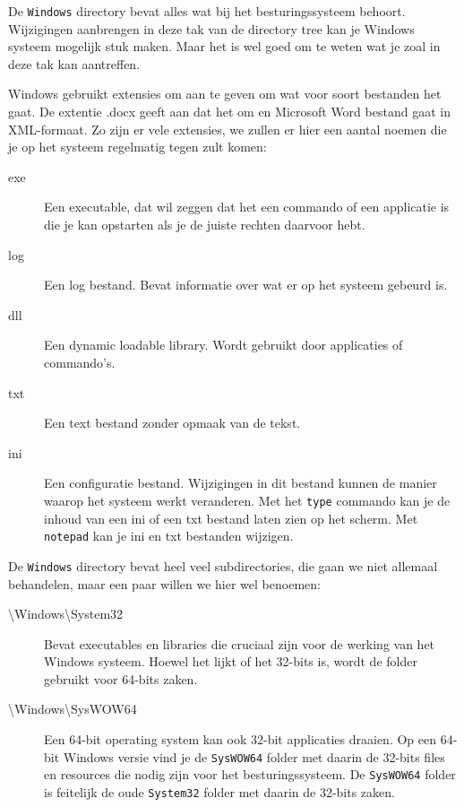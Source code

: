 De \texttt{Windows} directory bevat alles wat bij het besturingssysteem behoort. Wijzigingen aanbrengen in deze tak van de directory tree kan je Windows systeem mogelijk stuk maken. Maar het is wel goed om te weten wat je zoal in deze tak kan aantreffen.

Windows gebruikt extensies om aan te geven om wat voor soort bestanden het gaat. De extentie .docx geeft aan dat het om en Microsoft Word bestand gaat in XML-formaat. Zo zijn er vele extensies, we zullen er hier een aantal noemen die je op het systeem regelmatig tegen zult komen:
\begin{description}
\item[exe] Een executable, dat wil zeggen dat het een commando of een applicatie is die je kan opstarten als je de juiste rechten daarvoor hebt.
\item[log] Een log bestand. Bevat informatie over wat er op het systeem gebeurd is.
\item[dll] Een dynamic loadable library. Wordt gebruikt door applicaties of commando's.
\item[txt] Een text bestand zonder opmaak van de tekst.
\item[ini] Een configuratie bestand. Wijzigingen in dit bestand kunnen de manier waarop het systeem werkt veranderen. Met het \texttt{type} commando kan je de inhoud van een ini of een txt bestand laten zien op het scherm. Met \texttt{notepad} kan je ini en txt bestanden wijzigen.
\end{description}

De \texttt{Windows} directory bevat heel veel subdirectories, die gaan we niet allemaal behandelen, maar een paar willen we hier wel benoemen:
\begin{description}
\item[\textbackslash Windows\textbackslash System32] Bevat executables en libraries die cruciaal zijn voor de werking van het Windows systeem. Hoewel het lijkt of het 32-bits is, wordt de folder gebruikt voor 64-bits zaken.
\item[\textbackslash Windows\textbackslash SysWOW64] Een 64-bit operating system kan ook 32-bit applicaties draaien. Op een 64-bit Windows versie vind je de \texttt{SysWOW64} folder met daarin de 32-bits files en resources die nodig zijn voor het besturingssysteem. De \texttt{SysWOW64} folder is feitelijk de oude \texttt{System32} folder met daarin de 32-bits zaken.
\end{description}


